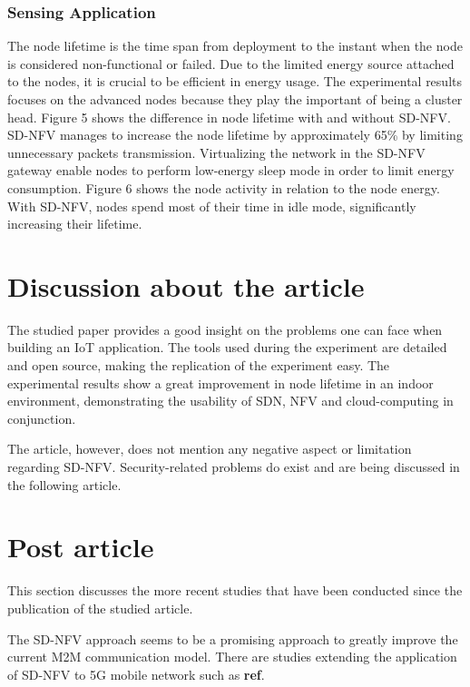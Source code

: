 \documentclass[10pt,journal,compsoc]{IEEEtran}
\begin{document}
\subsubsection{Sensing Application}

The node lifetime is the time span from deployment to the instant when 
the node is considered non-functional or failed. Due to the limited 
energy source attached to the nodes, it is crucial to be efficient 
in energy usage. The experimental results focuses on the advanced nodes 
because they play the important of being a cluster head. Figure 5 
shows the difference in node lifetime with and without SD-NFV. 
SD-NFV manages to increase the node lifetime by approximately 65\% 
by limiting unnecessary packets transmission. Virtualizing the network 
in the SD-NFV gateway enable nodes to perform low-energy sleep mode in 
order to limit energy consumption. Figure 6 shows the node activity 
in relation to the node energy. With SD-NFV, nodes spend most of their 
time in idle mode, significantly increasing their lifetime.

\section{Discussion about the article}

The studied paper provides a good insight on the problems one can face 
when building an IoT application. The tools used during the experiment 
are detailed and open source, making the replication of the experiment 
easy. The experimental results show a great improvement in node lifetime 
in an indoor environment, demonstrating the usability of SDN, NFV and 
cloud-computing in conjunction.

The article, however, does not mention any negative aspect or limitation 
regarding SD-NFV. Security-related problems do exist and are being 
discussed in the following article.

\section{Post article}

This section discusses the more recent studies that have been conducted 
since the publication of the studied article.

The SD-NFV approach seems to be a promising approach to greatly improve 
the current M2M communication model. There are studies extending 
the application of SD-NFV to 5G mobile network such as \textbf{ref}. 
\end{document}
